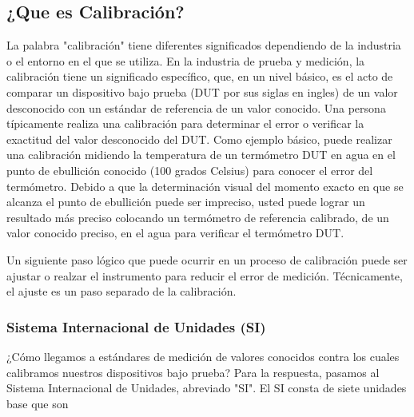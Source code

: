 \subsection{¿Que es Calibración?}
	\par 
		La palabra "calibración" tiene diferentes significados dependiendo de la industria o el entorno en el que se utiliza. En la industria de prueba y medición, la calibración tiene un significado específico, que, en un nivel básico, es el acto de comparar un dispositivo bajo prueba (DUT por sus siglas en ingles) de un valor desconocido con un estándar de referencia de un valor conocido. Una persona típicamente realiza una calibración para determinar el error o verificar la exactitud del valor desconocido del DUT. Como ejemplo básico, puede realizar una calibración midiendo la temperatura de un termómetro DUT en agua en el punto de ebullición conocido (100 grados Celsius) para conocer el error del termómetro. Debido a que la determinación visual del momento exacto en que se alcanza el punto de ebullición puede ser impreciso, usted puede lograr un resultado más preciso colocando un termómetro de referencia calibrado, de un valor conocido preciso, en el agua para verificar el termómetro DUT.
	
	\par \noindent
		Un siguiente paso lógico que puede ocurrir en un proceso de calibración puede ser ajustar o realzar el instrumento para reducir el error de medición. Técnicamente, el ajuste es un paso separado de la calibración.
		
	\subsubsection{Sistema Internacional de Unidades (SI)}
		\par 
			¿Cómo llegamos a estándares de medición de valores conocidos contra los cuales calibramos nuestros dispositivos bajo prueba? Para la respuesta, pasamos al Sistema Internacional de Unidades, abreviado "SI". El SI consta de siete unidades base que son
			
